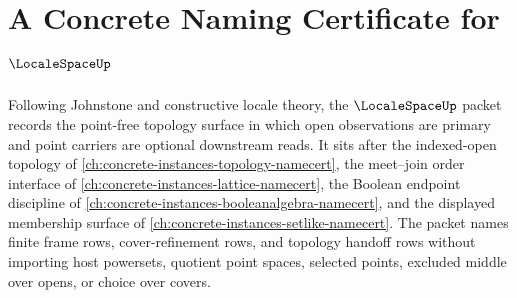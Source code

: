 \chapter{A Concrete Naming Certificate for $\LocaleSpaceUp$}
\label{ch:concrete-instances-locale-space-namecert}

Following Johnstone and constructive locale theory, the $\LocaleSpaceUp$ packet records the point-free topology surface in which open observations are primary and point carriers are optional downstream reads. It sits after the indexed-open topology of \autoref{ch:concrete-instances-topology-namecert}, the meet--join order interface of \autoref{ch:concrete-instances-lattice-namecert}, the Boolean endpoint discipline of \autoref{ch:concrete-instances-booleanalgebra-namecert}, and the displayed membership surface of \autoref{ch:concrete-instances-setlike-namecert}. The packet names finite frame rows, cover-refinement rows, and topology handoff rows without importing host powersets, quotient point spaces, selected points, excluded middle over opens, or choice over covers.


